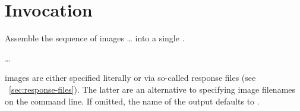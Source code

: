 

\chapter[Invocation]{\label{sec:invocation}%
  Invocation}



\noindent Assemble the sequence of images \dots{} into a single .

\smallskip

\code{\app}  
\dots

\smallskip

%
%
%
%
\noindent {} images are either specified literally or via so-called response files
(see \sectionName~\ref{sec:response-files}).  The latter are an alternative to specifying image
filenames on the command line.  If omitted, the name of the output  defaults to
.











